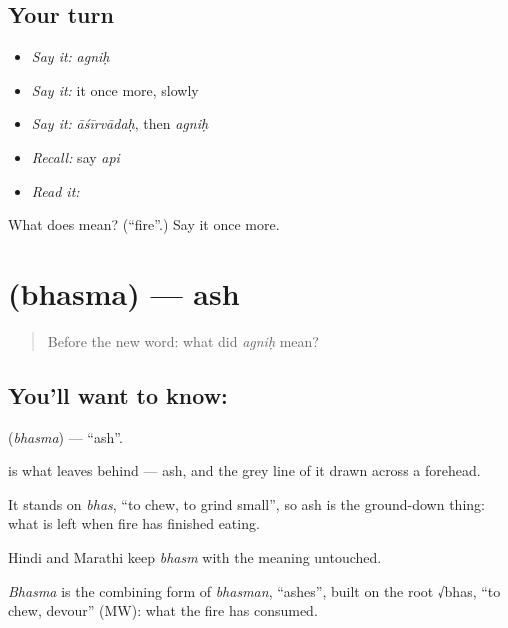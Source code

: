 \subsection*{Your turn}
\begin{itemize}
\raggedright
  \item \emph{Say it:} \emph{agniḥ}
  \item \emph{Say it:} it once more, slowly
  \item \emph{Say it:} \emph{āśīrvādaḥ}, then \emph{agniḥ}
  \item \emph{Recall:} say \emph{api}
  \item \emph{Read it:} \textbf{}
\end{itemize}

\begin{tcolorbox}[breakable,colback=teal!4,colframe=teal!35!black,title={Before you move on}]
What does  mean? (\textquotedblleft{}fire\textquotedblright{}.) Say it once more.
\end{tcolorbox}
\section[\texorpdfstring{\sk{भस्म} (bhasma)}{भस्म (bhasma)}]{ (bhasma) — ash}

\label{lesson:SA-C38-ash}



\begin{quote}
Before the new word: what did \emph{agniḥ} mean?
\end{quote}

\subsection*{You'll want to know: }
\textbf{} (\emph{bhasma}) — \textquotedblleft{}ash\textquotedblright{}.

\textbf{} is what  leaves behind — ash, and the grey line of it drawn across a forehead.

It stands on \emph{bhas}, \textquotedblleft{}to chew, to grind small\textquotedblright{}, so ash is the ground-down thing: what is left when fire has finished eating.

Hindi and Marathi keep \emph{bhasm} with the meaning untouched.

\begin{cousinweb}
\emph{Bhasma} is the combining form of \emph{bhasman}, \textquotedblleft{}ashes\textquotedblright{}, built on the root √bhas, \textquotedblleft{}to chew, devour\textquotedblright{} (MW): what the fire has consumed.
\end{cousinweb}

